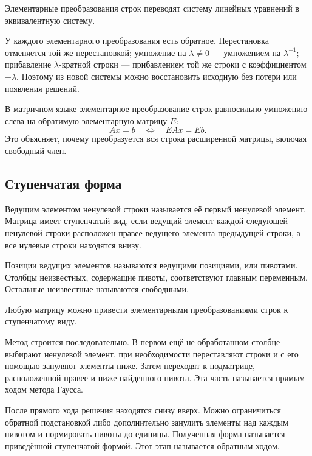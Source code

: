 \begin{proposition}
Элементарные преобразования строк переводят систему линейных уравнений в эквивалентную систему.
\end{proposition}

\begin{proofidea}
У каждого элементарного преобразования есть обратное. Перестановка отменяется той же перестановкой; умножение на \(\lambda\neq 0\) --- умножением на \(\lambda^{-1}\); прибавление \(\lambda\)-кратной строки --- прибавлением той же строки с коэффициентом \(-\lambda\). Поэтому из новой системы можно восстановить исходную без потери или появления решений.
\end{proofidea}

В матричном языке элементарное преобразование строк равносильно умножению слева на обратимую элементарную матрицу \(E\):
\[
Ax=b
\quad\Longleftrightarrow\quad
EAx=Eb.
\]
Это объясняет, почему преобразуется вся строка расширенной матрицы, включая свободный член.

\subsection{Ступенчатая форма}

\begin{definition}
Ведущим элементом ненулевой строки называется её первый ненулевой элемент. Матрица имеет ступенчатый вид, если ведущий элемент каждой следующей ненулевой строки расположен правее ведущего элемента предыдущей строки, а все нулевые строки находятся внизу.
\end{definition}

Позиции ведущих элементов называются ведущими позициями, или пивотами. Столбцы неизвестных, содержащие пивоты, соответствуют главным переменным. Остальные неизвестные называются свободными.

\begin{theorem}
Любую матрицу можно привести элементарными преобразованиями строк к ступенчатому виду.
\end{theorem}

Метод строится последовательно. В первом ещё не обработанном столбце выбирают ненулевой элемент, при необходимости переставляют строки и с его помощью зануляют элементы ниже. Затем переходят к подматрице, расположенной правее и ниже найденного пивота. Эта часть называется прямым ходом метода Гаусса.

После прямого хода решения находятся снизу вверх. Можно ограничиться обратной подстановкой либо дополнительно занулить элементы над каждым пивотом и нормировать пивоты до единицы. Полученная форма называется приведённой ступенчатой формой. Этот этап называется обратным ходом.

